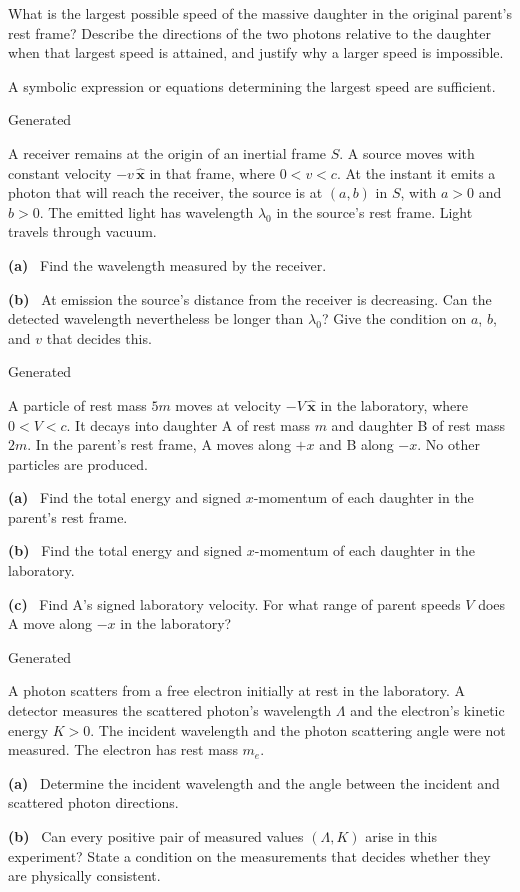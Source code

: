 \documentclass[12pt,letterpaper]{article}
\newcommand{\question}[1]{\noindent{\large\bfseries #1.}\hfill{\small Generated}\par\medskip}
\newcommand{\partlabel}[1]{\noindent\textbf{(#1)}\ }
\begin{document}
What is the largest possible speed of the massive daughter in the original
parent's rest frame? Describe the directions of the two photons relative to
the daughter when that largest speed is attained, and justify why a larger
speed is impossible.

A symbolic expression or equations determining the largest speed are sufficient.
\vfill
\newpage

\question{6}
A receiver remains at the origin of an inertial frame $S$. A source moves with
constant velocity $-v\,\hat{\mathbf x}$ in that frame, where $0<v<c$.
At the instant it emits a photon that will reach the receiver, the source is at
$(a,b)$ in $S$, with $a>0$ and $b>0$. The emitted light has wavelength
$\lambda_0$ in the source's rest frame. Light travels through vacuum.

\partlabel{a} Find the wavelength measured by the receiver.
\vfill

\partlabel{b} At emission the source's distance from the receiver is decreasing.
Can the detected wavelength nevertheless be longer than $\lambda_0$?
Give the condition on $a$, $b$, and $v$ that decides this.
\vfill
\newpage

\question{7}
A particle of rest mass $5m$ moves at velocity $-V\,\hat{\mathbf x}$ in the
laboratory, where $0<V<c$. It decays into daughter A of rest mass $m$ and
daughter B of rest mass $2m$. In the parent's rest frame, A moves along $+x$
and B along $-x$. No other particles are produced.

\partlabel{a} Find the total energy and signed $x$-momentum of each daughter
in the parent's rest frame.
\vfill

\partlabel{b} Find the total energy and signed $x$-momentum of each daughter
in the laboratory.
\vfill

\partlabel{c} Find A's signed laboratory velocity. For what range of parent
speeds $V$ does A move along $-x$ in the laboratory?
\vfill
\newpage

\question{8}
A photon scatters from a free electron initially at rest in the laboratory.
A detector measures the scattered photon's wavelength $\Lambda$ and the
electron's kinetic energy $K>0$. The incident wavelength and the photon
scattering angle were not measured. The electron has rest mass $m_e$.

\partlabel{a} Determine the incident wavelength and the angle between the
incident and scattered photon directions.
\vfill

\partlabel{b} Can every positive pair of measured values $(\Lambda,K)$ arise
in this experiment? State a condition on the measurements that decides whether
they are physically consistent.
\vfill
\newpage
\end{document}
